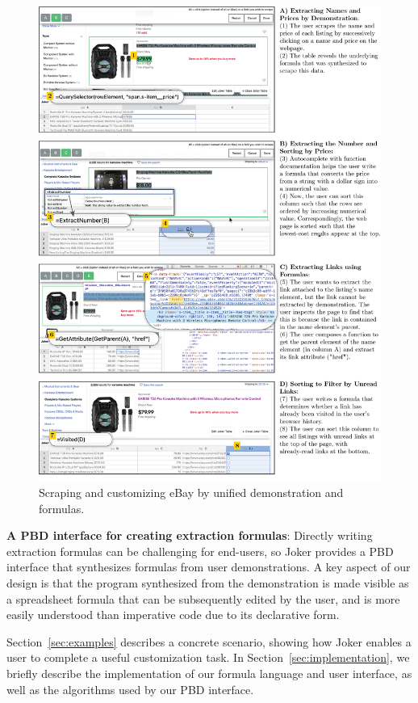 \documentclass[sigconf,10pt]{acmart}
\begin{document}
\begin{figure}
  \includegraphics[width=\textwidth]{media/ebay.png}
  \caption{\label{fig:ebay}Scraping and customizing eBay by unified demonstration and formulas.}
\end{figure}

\textbf{A PBD interface for creating extraction formulas}: Directly
writing extraction formulas can be challenging for end-users, so Joker
provides a PBD interface that synthesizes formulas from user
demonstrations. A key aspect of our design is that the program
synthesized from the demonstration is made visible as a spreadsheet
formula that can be subsequently edited by the user, and is more easily
understood than imperative code due to its declarative form.

Section~\ref{sec:examples} describes a concrete scenario, showing how
Joker enables a user to complete a useful customization task. In
Section~\ref{sec:implementation}, we briefly describe the implementation
of our formula language and user interface, as well as the algorithms
used by our PBD interface.
\end{document}
